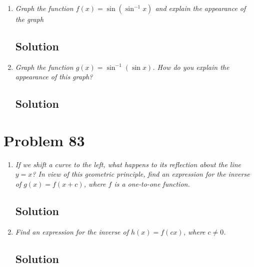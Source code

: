 \documentclass[11pt]{article}
\newcommand{\soln}{\subsection*}
\newcommand{\qn}{\textit}
\begin{document}
\begin{enumerate}
	\item \qn{Graph the function $f(x)=\sin(\sin^{-1}x)$ and explain the appearance of the graph}
	\soln{Solution}
	
	\item \qn{Graph the function $g(x)=\sin^{-1}(\sin{x})$. How do you explain the appearance of this graph?}
	\soln{Solution}
\end{enumerate}

\section*{Problem 83}

\begin{enumerate}
	\item \qn{If we shift a curve to the left, what happens to its reflection about the line $y=x$? In view of this geometric principle, find an expression for the inverse of $g(x)=f(x+c)$, where $f$ is a one-to-one function.}
	\soln{Solution}
	
	\item \qn{Find an expression for the inverse of $h(x)=f(cx)$, where $c \ne 0$.}
	\soln{Solution}
\end{enumerate}
\end{document}
